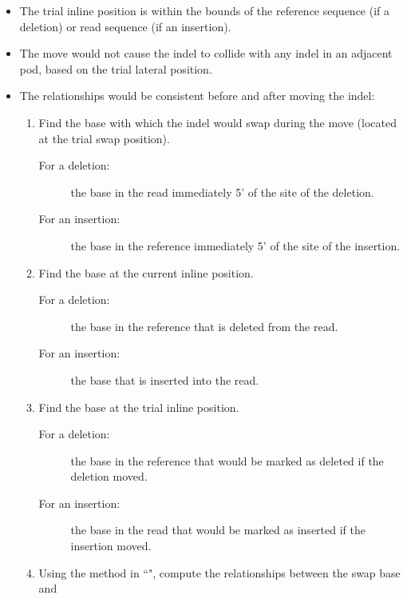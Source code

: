 \documentclass{article}
\begin{document}
\begin{enumerate}
\begin{enumerate}
\begin{enumerate}
\begin{itemize}
                \item The trial inline position is within the bounds of the reference sequence (if a deletion) or read sequence (if an insertion).
                \item The move would not cause the indel to collide with any indel in an adjacent pod, based on the trial lateral position.
                \item The relationships would be consistent before and after moving the indel:
                \begin{enumerate}
                    \item Find the base with which the indel would swap during the move (located at the trial swap position).
                    \begin{description}
                        \item[For a deletion:] the base in the read immediately 5' of the site of the deletion.
                        \item[For an insertion:] the base in the reference immediately 5' of the site of the insertion.
                    \end{description}
                    \item Find the base at the current inline position.
                    \begin{description}
                        \item[For a deletion:] the base in the reference that is deleted from the read.
                        \item[For an insertion:] the base that is inserted into the read.
                    \end{description}
                    \item Find the base at the trial inline position.
                    \begin{description}
                        \item[For a deletion:] the base in the reference that would be marked as deleted if the deletion moved.
                        \item[For an insertion:] the base in the read that would be marked as inserted if the insertion moved.
                    \end{description}
                    \item Using the method in ``", compute the relationships between the swap base and
                    \begin{itemize}

\end{itemize}
\end{enumerate}
\end{itemize}
\end{enumerate}
\end{enumerate}
\end{enumerate}
\end{document}
